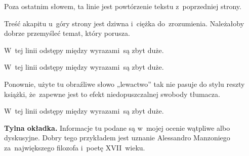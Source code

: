 \documentclass[a4paper,11pt]{article}
\begin{document}
\vspace{\spaceFour}





\start {} Poza ostatnim słowem, ta linie jest powtórzenie
tekstu z~poprzedniej strony.

\vspace{\spaceFour}





\start {} Treść akapitu u~góry strony jest dziwna i~ciężka
do~zrozumienia. Należałoby dobrze przemyśleć temat, który porusza.

\vspace{\spaceFour}





\start {} W~tej linii odstępy między wyrazami~są zbyt
duże.

\vspace{\spaceFour}





\start {} W~tej linii odstępy między wyrazami~są zbyt
duże.

\vspace{\spaceFour}





\start {} Ponownie, użyte tu obraźliwe słowo „lewactwo”
tak nie pasuje do stylu reszty książki, że~zapewne jest to efekt
niedopuszczalnej swobody tłumacza.

\vspace{\spaceFour}





\start {} W~tej linii odstępy między wyrazami~są zbyt
duże.

\vspace{\spaceFour}





\start \textbf{Tylna okładka.} Informacje tu podane są w~mojej ocenie
wątpliwe albo dyskusyjne. Dobry tego przykładem jest uznanie
Alessandro Manzoniego za~największego filozofa i~poetę XVII~wieku.

\vspace{\spaceFour}





\end{document}
